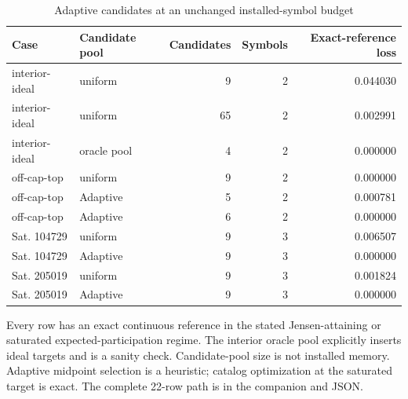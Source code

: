 \begin{table}[p]\centering\small
\caption{Adaptive candidates at an unchanged installed-symbol budget}\label{tab:r45-continuous}
\begin{tabular}{llrrr}\toprule
Case & Candidate pool & Candidates & Symbols & Exact-reference loss \\
\midrule
interior-ideal & uniform & 9 & 2 & 0.044030 \\
interior-ideal & uniform & 65 & 2 & 0.002991 \\
interior-ideal & oracle pool & 4 & 2 & 0.000000 \\
off-cap-top & uniform & 9 & 2 & 0.000000 \\
off-cap-top & Adaptive & 5 & 2 & 0.000781 \\
off-cap-top & Adaptive & 6 & 2 & 0.000000 \\
Sat. 104729 & uniform & 9 & 3 & 0.006507 \\
Sat. 104729 & Adaptive & 9 & 3 & 0.000000 \\
Sat. 205019 & uniform & 9 & 3 & 0.001824 \\
Sat. 205019 & Adaptive & 9 & 3 & 0.000000 \\
\bottomrule\end{tabular}
\par\smallskip\begin{minipage}{.98\textwidth}\footnotesize Every row has an exact continuous reference in the stated Jensen-attaining or saturated expected-participation regime. The interior oracle pool explicitly inserts ideal targets and is a sanity check. Candidate-pool size is not installed memory. Adaptive midpoint selection is a heuristic; catalog optimization at the saturated target is exact. The complete 22-row path is in the companion and JSON.\end{minipage}
\end{table}

